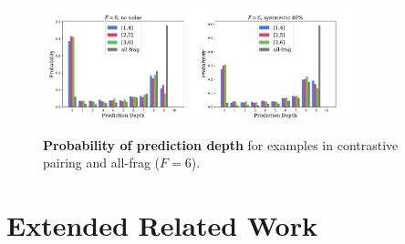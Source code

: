 \documentclass{article}
\theoremstyle{plain}
\theoremstyle{definition}
\theoremstyle{remark}
\begin{document}
\begin{figure}[th]
\begin{center}
\centerline{\includegraphics[width=0.8\textwidth]{imgs/pred_depth_plot_f6.pdf}}
\caption{
    \textbf{Probability of prediction depth} for examples in contrastive pairing and all-frag ($F=6$).}
\vskip -0.15in
\label{fig:pred_depth_plot_f6}
\end{center}
\end{figure}

\section{Extended Related Work}\label{subsec:related_work}


\end{document}
